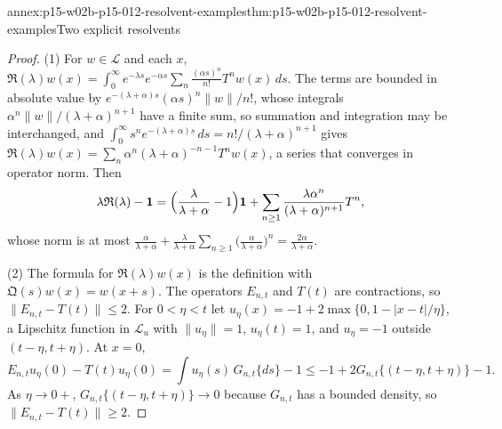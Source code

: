 \begin{annexitem}{annex:p15-w02b-p15-012-resolvent-examples}{thm:p15-w02b-p15-012-resolvent-examples}{Two explicit resolvents}
\begin{proof}
(1) For \(w\in\mathscr L\) and each \(x\),
\(\mathfrak R(\lambda)w(x)=\int_0^\infty e^{-\lambda s}e^{-\alpha s}\sum_n\frac{(\alpha s)^n}{n!}T^nw(x)\,ds\).
The terms are bounded in absolute value by
\(e^{-(\lambda+\alpha)s}(\alpha s)^n\|w\|/n!\), whose integrals
\(\alpha^n\|w\|/(\lambda+\alpha)^{n+1}\) have a finite sum, so summation and
integration may be interchanged, and
\(\int_0^\infty s^ne^{-(\lambda+\alpha)s}\,ds=n!/(\lambda+\alpha)^{n+1}\) gives
\(\mathfrak R(\lambda)w(x)=\sum_n\alpha^n(\lambda+\alpha)^{-n-1}T^nw(x)\), a
series that converges in operator norm. Then
\[
 \lambda\mathfrak R(\lambda)-\mathbf 1
   =\Bigl(\frac\lambda{\lambda+\alpha}-1\Bigr)\mathbf 1
    +\sum_{n\geq1}\frac{\lambda\alpha^n}{(\lambda+\alpha)^{n+1}}T^n,
\]
whose norm is at most
\(\frac\alpha{\lambda+\alpha}+\frac\lambda{\lambda+\alpha}\sum_{n\geq1}\bigl(\frac\alpha{\lambda+\alpha}\bigr)^n
=\frac{2\alpha}{\lambda+\alpha}\).

(2) The formula for \(\mathfrak R(\lambda)w(x)\) is the definition with
\(\mathfrak Q(s)w(x)=w(x+s)\). The operators \(E_{n,t}\) and \(T(t)\) are
contractions, so \(\|E_{n,t}-T(t)\|\leq2\). For \(0<\eta<t\) let
\(u_\eta(x)=-1+2\max\{0,1-|x-t|/\eta\}\), a Lipschitz function in
\(\mathscr L_u\) with \(\|u_\eta\|=1\), \(u_\eta(t)=1\), and \(u_\eta=-1\)
outside \((t-\eta,t+\eta)\). At \(x=0\),
\[
 E_{n,t}u_\eta(0)-T(t)u_\eta(0)=\int u_\eta(s)\,G_{n,t}\{ds\}-1
   \leq-1+2G_{n,t}\{(t-\eta,t+\eta)\}-1 .
\]
As \(\eta\to0+\), \(G_{n,t}\{(t-\eta,t+\eta)\}\to0\) because \(G_{n,t}\) has a
bounded density, so \(\|E_{n,t}-T(t)\|\geq2\).
\end{proof}
\end{annexitem}
